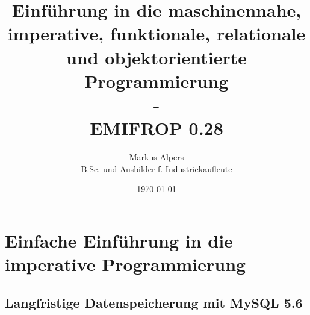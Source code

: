 \documentclass[11pt, a4paper, oneside, draft]{book}
\begin{document}

\title{Einführung in die maschinennahe, imperative, funktionale, relationale und objektorientierte Programmierung\\-\\EMIFROP 0.28}
\author{Markus Alpers\\B.Sc. und Ausbilder f. Industriekaufleute}
\date{\today}

\maketitle


\tableofcontents




\part{Einfache Einführung in die imperative Programmierung}











%
\chapter{Langfristige Datenspeicherung mit MySQL 5.6}


%

%


%

%

%

\renewcommand{\indexname}{Stichwortverzeichnis}		%
\printindex
\end{document}
